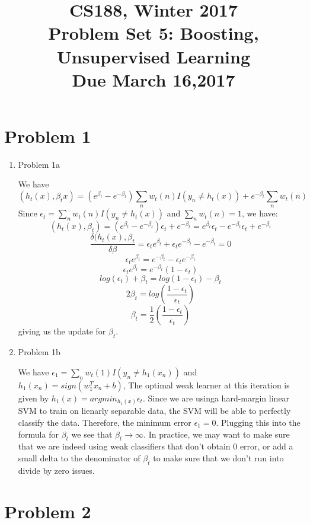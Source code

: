 \documentclass[11pt]{article}
\newcommand{\cnum}{CS188}
\newcommand{\ced}{Winter 2017}
\newcommand{\ctitle}[3]{\title{\vspace{-0.5in}\cnum, \ced\\Problem Set #1: #2\\Due #3}}
\newcommand{\solution}[1]{{{\color{blue}{\bf Solution:} {#1}}}}
\begin{document}
\ctitle{5}{Boosting, Unsupervised Learning}{March 16,2017}
\author{}
\date{}
\maketitle
\vspace{-0.75in}

\section{Problem 1}
\begin{enumerate}
\item Problem 1a

\solution{
We have \[ (h_t(x),\beta_tx) = (e^{\beta_t} - e^{-\beta_t})\sum_{n}w_t(n)I(y_n \neq h_t(x)) + e^{-\beta_t} \sum_n w_{t}(n) \]
Since $ \epsilon_t = \sum_{n}w_t(n)I(y_n \neq h_t(x))$ and $\sum_n w_t(n) = 1$, we have:
\[ (h_t(x),\beta_t) = (e^{\beta_t} - e^{-\beta_t})\epsilon_t + e^{-\beta_t} = e^{\beta_t}\epsilon_t - e^{-\beta_t}\epsilon_t + e^{-\beta_t} \]
\[ \frac{\delta (h_t(x), \beta_t}{\delta \beta} = \epsilon_t e^{\beta_t} + \epsilon_t e^{-\beta_t} - e^{-\beta_t} = 0 \] \[\epsilon_t e^{\beta_t} = e^{-\beta_t} - \epsilon_t e^{-\beta_t} \] \[\epsilon_t e^{\beta_t} = e^{-\beta_t}(1 - \epsilon_t) \] \[ log(\epsilon_t) + \beta_t = log(1 - \epsilon_t) - \beta_t \] \[ 2\beta_t = log( \frac{1 - \epsilon_t}{\epsilon_t}) \] \[ \beta_t = \frac{1}{2}(\frac{1 - \epsilon_t}{\epsilon_t}) \] giving us the update for $\beta_t$. 
}


\item Problem 1b

\solution{
We have $\epsilon_1 = \sum_n w_t(1) I(y_n \neq h_1(x_n)) $ and $h_1(x_n) = sign(w_1^Tx_n + b)$, The optimal weak learner at this iteration is given by $h_1(x) = argmin_{h_1(x)} \epsilon_t$. Since we are usinga hard-margin linear SVM to train on lienarly separable data, the SVM will be able to perfectly classify the data. Therefore, the minimum error $\epsilon_1 = 0$. Plugging this into the formula for $\beta_t$ we see that $\beta_t \rightarrow{} \infty$. In practice, we may want to make sure that we are indeed using weak classifiers that don't obtain 0 error, or add a small delta to the denominator of $\beta_t$ to make sure that we don't run into divide by zero issues. 
}
\end{enumerate}

\newpage
\section{Problem 2}
\end{document}
